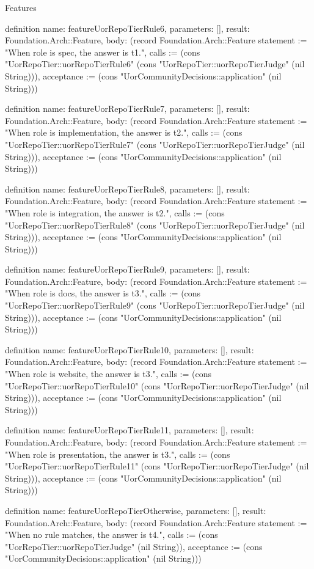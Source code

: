 \begin{lexlean}{Features}
\begin{semanticmodule}
definition{
  name: featureUorRepoTierRule6,
  parameters: [],
  result: Foundation.Arch::Feature,
  body: (record Foundation.Arch::Feature {statement := "When role is spec, the answer is t1.", calls := (cons "UorRepoTier::uorRepoTierRule6" (cons "UorRepoTier::uorRepoTierJudge" (nil String))), acceptance := (cons "UorCommunityDecisions::application" (nil String))})
}

definition{
  name: featureUorRepoTierRule7,
  parameters: [],
  result: Foundation.Arch::Feature,
  body: (record Foundation.Arch::Feature {statement := "When role is implementation, the answer is t2.", calls := (cons "UorRepoTier::uorRepoTierRule7" (cons "UorRepoTier::uorRepoTierJudge" (nil String))), acceptance := (cons "UorCommunityDecisions::application" (nil String))})
}

definition{
  name: featureUorRepoTierRule8,
  parameters: [],
  result: Foundation.Arch::Feature,
  body: (record Foundation.Arch::Feature {statement := "When role is integration, the answer is t2.", calls := (cons "UorRepoTier::uorRepoTierRule8" (cons "UorRepoTier::uorRepoTierJudge" (nil String))), acceptance := (cons "UorCommunityDecisions::application" (nil String))})
}

definition{
  name: featureUorRepoTierRule9,
  parameters: [],
  result: Foundation.Arch::Feature,
  body: (record Foundation.Arch::Feature {statement := "When role is docs, the answer is t3.", calls := (cons "UorRepoTier::uorRepoTierRule9" (cons "UorRepoTier::uorRepoTierJudge" (nil String))), acceptance := (cons "UorCommunityDecisions::application" (nil String))})
}

definition{
  name: featureUorRepoTierRule10,
  parameters: [],
  result: Foundation.Arch::Feature,
  body: (record Foundation.Arch::Feature {statement := "When role is website, the answer is t3.", calls := (cons "UorRepoTier::uorRepoTierRule10" (cons "UorRepoTier::uorRepoTierJudge" (nil String))), acceptance := (cons "UorCommunityDecisions::application" (nil String))})
}

definition{
  name: featureUorRepoTierRule11,
  parameters: [],
  result: Foundation.Arch::Feature,
  body: (record Foundation.Arch::Feature {statement := "When role is presentation, the answer is t3.", calls := (cons "UorRepoTier::uorRepoTierRule11" (cons "UorRepoTier::uorRepoTierJudge" (nil String))), acceptance := (cons "UorCommunityDecisions::application" (nil String))})
}

definition{
  name: featureUorRepoTierOtherwise,
  parameters: [],
  result: Foundation.Arch::Feature,
  body: (record Foundation.Arch::Feature {statement := "When no rule matches, the answer is t4.", calls := (cons "UorRepoTier::uorRepoTierJudge" (nil String)), acceptance := (cons "UorCommunityDecisions::application" (nil String))})
}


\end{semanticmodule}
\end{lexlean}
